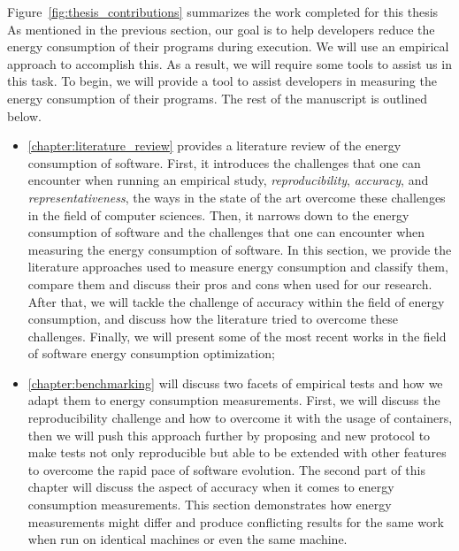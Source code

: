 Figure~\ref{fig:thesis_contributions} summarizes the work completed for this thesis As mentioned in the previous section, our goal is to help developers reduce the energy consumption of their programs during execution.
We will use an empirical approach to accomplish this.
As a result, we will require some tools to assist us in this task.
To begin, we will provide a tool to assist developers in measuring the energy consumption of their programs.
The rest of the manuscript is outlined below.

\begin{itemize}
    \item \cref{chapter:literature_review} provides a literature review of the energy consumption of software.
    First, it introduces the challenges that one can encounter when running an empirical study, \emph{reproducibility}, \emph{accuracy}, and \emph{representativeness}, the ways in the state of the art overcome these challenges in the field of computer sciences.
    Then, it narrows down to the energy consumption of software and the challenges that one can encounter when measuring the energy consumption of software.
    In this section, we provide the literature approaches used to measure energy consumption and classify them, compare them and discuss their pros and cons when used for our research. After that, we will tackle the challenge of accuracy within the field of energy consumption, and discuss how the literature tried to overcome these challenges. Finally, we will present some of the most recent works in the field of software energy consumption optimization;
    \item \cref{chapter:benchmarking} will discuss two facets of empirical tests and how we adapt them to energy consumption measurements.
    First, we will discuss the reproducibility challenge and how to overcome it with the usage of containers, then we will push this approach further by proposing and new protocol to make tests not only reproducible but able to be extended with other features to overcome the rapid pace of software evolution.
    The second part of this chapter will discuss the aspect of accuracy when it comes to energy consumption measurements. 
    This section demonstrates how energy measurements might differ and produce conflicting results for the same work when run on identical machines or even the same machine. 

\end{itemize}
